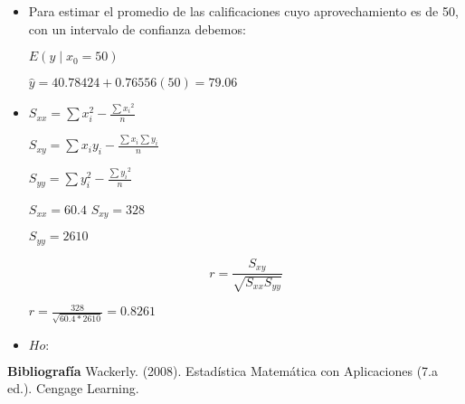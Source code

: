 \documentclass{../oxmathproblems}
\begin{document}
\begin{questions}
\begin{itemize}

\item Para estimar el promedio de las calificaciones cuyo aprovechamiento es de 50, con un intervalo de confianza debemos: 

  $ E(y\mid x_0 = 50) $ 

$ \hat{y} = 40.78424 + 0.76556(50) = 79.06 $ 
\end{itemize} 

\miquestion 
\begin{itemize}
\item 


$ S_{xx} = \sum{x_i^2} - \frac{\sum{x_i}^2}{n}$  

$ S_{xy} = \sum{x_iy_i} - \frac{\sum{x_i}\sum{y_i}}{n} $

$ S_{yy} = \sum{y_i^2} - \frac{\sum{y_i}^2}{n}$  

$S_{xx} = 60.4$ 
$S_{xy} = 328 $ 

$S_{yy} = 2610 $

$$ r = \frac{S_{xy}}{ \sqrt{S_{xx}S_{yy}}} $$ 


$r = \frac{328}{\sqrt{60.4*2610}} = 0.8261 $ 


\item 
{}

$ Ho: $



\end{itemize}




\textbf{Bibliografía}
Wackerly. (2008). Estadística Matemática con Aplicaciones (7.a ed.). Cengage Learning.


\end{questions}
\end{document}
